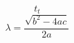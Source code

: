 \documentclass[UTF8]{ctexart}
\begin{document}
    \[t_t\]
\begin{equation}
    \lambda=\frac{\sqrt{b^2-4ac}}{2a}
\end{equation}
\end{document}

